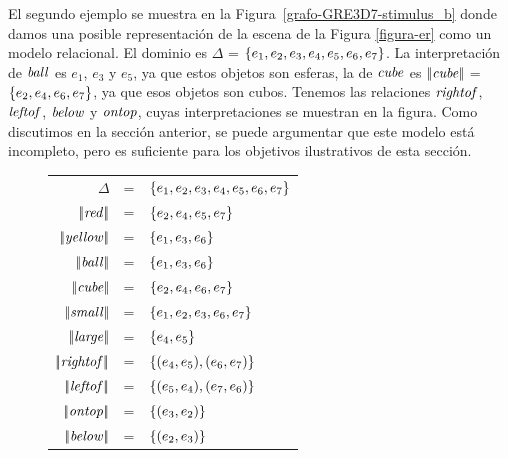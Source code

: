 El segundo ejemplo se muestra en la Figura~\ref{grafo-GRE3D7-stimulus_b} donde damos una posible representaci\'on de la escena de la Figura \ref{figura-er} como un modelo relacional. El dominio es $\Delta$  = $\{e_1,e_2,e_3,e_4,e_5,e_6,e_7\}$. La interpretaci\'on de $\mathit{ball}$ es $e_1$, $e_3$ y $e_5$, ya que estos objetos son esferas, la de $\mathit{cube}$ es $|\!|\mathit{cube}|\!|$ =$\{e_2, e_4, e_6, e_7\}$, ya que esos objetos son cubos. Tenemos las relaciones $\mathit{rightof}$, $\mathit{leftof}$, $\mathit{below}$ y $\mathit{ontop}$, cuyas interpretaciones se muestran en la figura. Como discutimos en la secci\'on anterior, se puede argumentar que este modelo est\'a incompleto, pero es suficiente para los objetivos ilustrativos de esta secci\'on.

\begin{figure}
\begin{flushleft}
\begin{tabular}{rcl}
$\Delta$              & = & $\{e_1,e_2,e_3,e_4,e_5,e_6,e_7\}$\\
$|\!|\mathit{red}|\!|$      & = & $\{e_2,e_4,e_5,e_7\}$\\
$|\!|\mathit{yellow}|\!|$   & = & $\{e_1,e_3,e_6\}$\\
$|\!|\mathit{ball}|\!|$     & = & $\{e_1,e_3,e_6\}$\\
$|\!|\mathit{cube}|\!|$     & = & $\{e_2,e_4,e_6,e_7\}$\\

$|\!|\mathit{small}|\!|$    & = & $\{e_1,e_2,e_3,e_6,e_7\}$\\
$|\!|\mathit{large}|\!|$    & = & $\{e_4,e_5\}$\\

$|\!|\mathit{rightof}|\!|$   & = & $\{(e_4,e_5),(e_6,e_7)\}$\\
$|\!|\mathit{leftof}|\!|$    & = & $\{(e_5,e_4),(e_7,e_6)\}$\\
$|\!|\mathit{ontop}|\!|$     & = & $\{(e_3,e_2)\}$\\
$|\!|\mathit{below}|\!|$     & = & $\{(e_2,e_3)\}$\\


\end{tabular}
\end{flushleft}
\end{figure}
